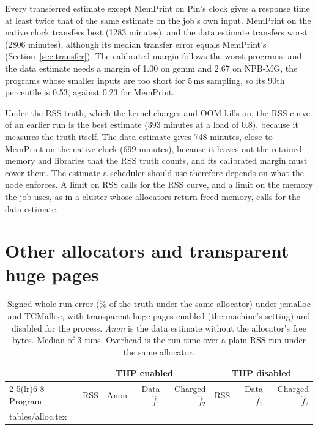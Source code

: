 \documentclass[11pt]{article}
\makeatletter
\newcommand{\memprint}{MemPrint}
\newcommand{\secref}[1]{Section~\ref{#1}}
\newcommand{\tabinput}[1]{\@@input #1 }   %
\makeatother
\begin{document}
Every transferred estimate except \memprint{} on Pin's clock gives a response time at least twice that of the same
estimate on the job's own input. \memprint{} on the native clock transfers best (1283 minutes), and the data estimate
transfers worst (2806 minutes), although its median transfer error equals \memprint{}'s (\secref{sec:transfer}). The
calibrated margin follows the worst programs, and the data estimate needs a margin of 1.00 on gemm and 2.67 on NPB-MG,
the programs whose smaller inputs are too short for 5\,ms sampling, so its 90th percentile is 0.53, against 0.23 for
\memprint{}.

Under the RSS truth, which the kernel charges and OOM-kills on, the RSS curve of an earlier run is the best estimate
(393 minutes at a load of 0.8), because it measures the truth itself. The data estimate gives 748 minutes, close to
\memprint{} on the native clock (699 minutes), because it leaves out the retained memory and libraries that the RSS
truth counts, and its calibrated margin must cover them. The estimate a scheduler should use therefore depends on what
the node enforces. A limit on RSS calls for the RSS curve, and a limit on the memory the job uses, as in a cluster
whose allocators return freed memory, calls for the data estimate.

\section{Other allocators and transparent huge pages}
\label{sec:alloc}

\begin{table}[t]
\centering
\small
\caption{Signed whole-run error (\% of the truth under the same allocator) under jemalloc and TCMalloc, with
transparent huge pages enabled (the machine's setting) and disabled for the process. \emph{Anon} is the data estimate
without the allocator's free bytes. Median of 3 runs. Overhead is the run time over a plain RSS run under the same
allocator.}
\label{tab:alloc}
\setlength{\tabcolsep}{5pt}
\begin{tabular}{lrrrrrrr}
\toprule
 & \multicolumn{4}{c}{THP enabled} & \multicolumn{3}{c}{THP disabled} \\
\cmidrule(lr){2-5}\cmidrule(lr){6-8}
Program & RSS & Anon & Data $\hat f_1$ & Charged $\hat f_2$ & RSS & Data $\hat f_1$ & Charged $\hat f_2$ \\
\midrule
\tabinput{tables/alloc.tex}
\bottomrule
\end{tabular}
\end{table}
\end{document}
